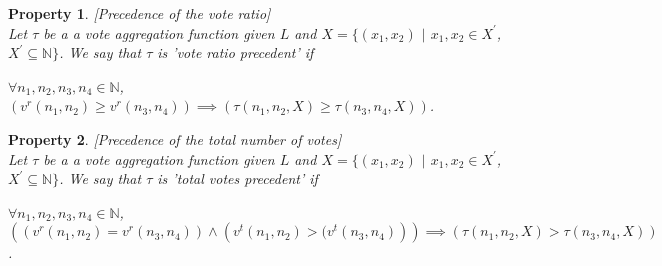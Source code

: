 \documentclass{article}
\newtheorem{property}{Property}
\newcommand{\nat}{\mathbb{N}}   %
\newcommand{\valueset}{L}
\begin{document}
\begin{property}
\label{P2}[Precedence of the vote ratio]\\
Let $\tau$ be a a vote aggregation function given $\valueset$ and $X = \{(x_{1}, x_{2})$ $|$ $x_{1}, x_{2} \in X^{'}$, $X^{'} \subseteq \nat \}$. We say that $\tau$ is 'vote ratio precedent' if
\begin{center}
$\forall n_1, n_2, n_3, n_4 \in \nat$,  \\
$\left( v^{r}(n_{1}, n_{2}) \ge v^{r}(n_{3}, n_{4}) \right) \implies \left( \tau(n_{1}, n_{2}, X) \ge \tau(n_{3}, n_{4}, X) \right)$. \\


\end{center}

\end{property}




\begin{property}
\label{P3}[Precedence of the total number of votes] \\
Let $\tau$ be a a vote aggregation function given $\valueset$ and $X = \{(x_{1}, x_{2})$ $|$ $x_{1}, x_{2} \in X^{'}$, $X^{'} \subseteq \nat \}$. We say that $\tau$ is 'total votes precedent' if
\begin{center}
 $\forall n_1, n_2, n_3, n_4 \in \nat$,  \\
$\left( \left(v^{r}(n_{1}, n_{2}) = v^{r}(n_{3}, n_{4}) \right) \land  \left( v^{t}(n_{1}, n_{2}) > ( v^{t}(n_{3}, n_{4}) \right) \right) \implies \left( \tau(n_{1}, n_{2}, X) > \tau(n_{3}, n_{4}, X) \right)$. 
\\

\end{center}
\end{property}

\end{document}
